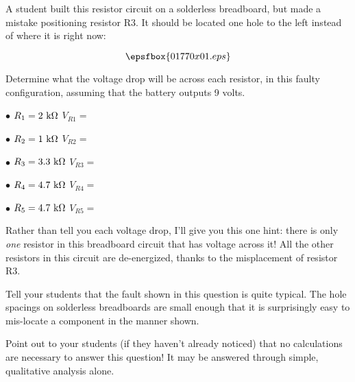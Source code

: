 

A student built this resistor circuit on a solderless breadboard, but made a mistake positioning resistor R3.  It should be located one hole to the left instead of where it is right now:

$$\epsfbox{01770x01.eps}$$

Determine what the voltage drop will be across each resistor, in this faulty configuration, assuming that the battery outputs 9 volts.

\medskip
\item{$\bullet$} $R_1 = 2 \hbox{ k} \Omega$ \hskip 10pt $V_{R1} = $
\item{$\bullet$} $R_2 = 1 \hbox{ k} \Omega$ \hskip 10pt $V_{R2} = $
\item{$\bullet$} $R_3 = 3.3 \hbox{ k} \Omega$ \hskip 10pt $V_{R3} = $
\item{$\bullet$} $R_4 = 4.7 \hbox{ k} \Omega$ \hskip 10pt $V_{R4} = $
\item{$\bullet$} $R_5 = 4.7 \hbox{ k} \Omega$ \hskip 10pt $V_{R5} = $
\medskip







Rather than tell you each voltage drop, I'll give you this one hint: there is only {\it one} resistor in this breadboard circuit that has voltage across it!  All the other resistors in this circuit are de-energized, thanks to the misplacement of resistor R3.







Tell your students that the fault shown in this question is quite typical.  The hole spacings on solderless breadboards are small enough that it is surprisingly easy to mis-locate a component in the manner shown.

Point out to your students (if they haven't already noticed) that no calculations are necessary to answer this question!  It may be answered through simple, qualitative analysis alone.




